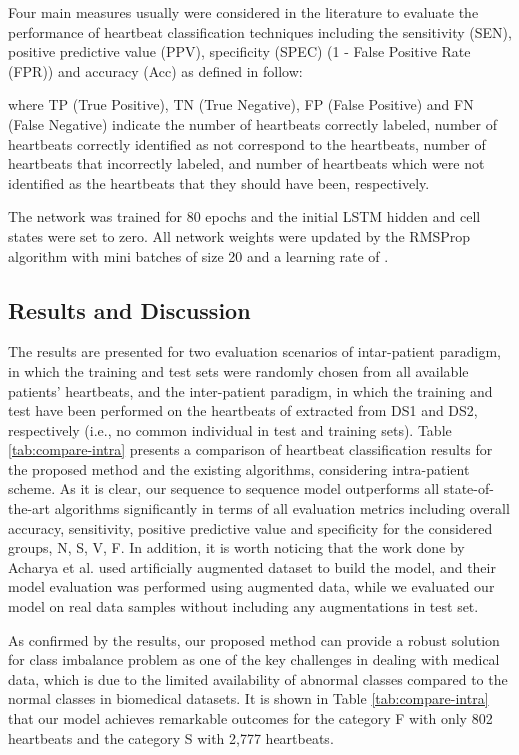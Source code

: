 \documentclass{article}
\begin{document}
Four main measures usually were considered in the literature to evaluate the performance of heartbeat classification techniques including the sensitivity (SEN), positive predictive value (PPV), specificity (SPEC) (1 - False Positive Rate (FPR)) and accuracy (Acc) as defined in follow:
 
where TP (True Positive), TN (True Negative), FP (False Positive) and FN (False Negative) indicate the number of heartbeats correctly labeled, number of heartbeats correctly identified as not correspond to the heartbeats, number of heartbeats that incorrectly labeled, and number of heartbeats which were not identified as the heartbeats that they should have been, respectively.

The network was trained for 80 epochs and
the initial LSTM hidden and cell states were set to zero. All network weights were updated by the RMSProp algorithm  with mini batches of size 20 and a learning rate of . 

\subsection{Results and Discussion}
\label{sec:results}
The results are presented for two evaluation scenarios of intar-patient paradigm, in which the training and test sets were randomly chosen from all available patients' heartbeats, and the inter-patient paradigm, in which the training and test have been performed on the heartbeats of extracted from DS1 and DS2, respectively (i.e., no common individual in test and training sets). Table \ref{tab:compare-intra} presents a comparison of heartbeat classification results for the proposed method and the existing algorithms, considering intra-patient scheme. As it is clear, our sequence to sequence model outperforms all state-of-the-art algorithms significantly in terms of all evaluation metrics including overall accuracy, sensitivity, positive predictive value and specificity for the considered groups, N, S, V, F.
In addition, it is worth noticing that the work done by Acharya et al. \cite{acharya2017deep} used artificially augmented dataset to build the model, and their model evaluation was performed using augmented data, while we evaluated our model on real data samples without including any augmentations in test set.

As confirmed by the results, our proposed method can provide a robust solution for class imbalance problem as one of the key challenges in dealing with medical data, which is due to the limited availability of abnormal classes compared to the normal classes in biomedical datasets. It is shown in Table \ref{tab:compare-intra} that our model achieves remarkable outcomes for the category F with only 802 heartbeats and the category S with 2,777 heartbeats.
\end{document}
